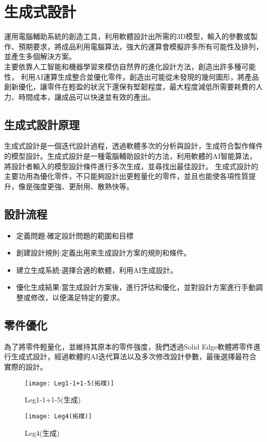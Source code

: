 \chapter{生成式設計}
運用電腦輔助系統的創造工具，利用軟體設計出所需的3D模型，輸入的參數或製作、預期要求，將成品利用電腦算法，強大的運算會模擬許多所有可能性及排列，並產生多個解決方案。\\
主要依靠人工智能和機器學習來模仿自然界的進化設計方法，創造出許多種可能性，
利用AI運算生成整合並優化零件，創造出可能從未發現的幾何圖形，將產品創新優化，讓零件在輕盈的狀況下還保有堅韌程度，最大程度減低所需要耗費的人力、時間成本，讓成品可以快速並有效的產出。\\

\section{生成式設計原理}
生成式設計是一個迭代設計過程，透過軟體多次的分析與設計，生成符合製作條件的模型設計。生成式設計是一種電腦輔助設計的方法，利用軟體的AI智能算法，將設計者輸入的模型設計條件進行多次生成，並尋找出最佳設計。
生成式設計的主要功用為優化零件，不只能夠設計出更輕量化的零件，並且也能使各項性質提升，像是強度更強、更耐用、散熱快等。\

\section{設計流程}
\begin{itemize}
\item 定義問題:確定設計問題的範圍和目標
\item 創建設計規則:定義出用來生成設計方案的規則和條件。
\item	建立生成系統:選擇合適的軟體，利用AI生成設計。
\item 優化生成結果:當生成設計方案後，進行評估和優化，並對設計方案進行手動調整或修改，以便滿足特定的要求。
\end{itemize}

\section{零件優化}
為了將零件輕量化，並維持其原本的零件強度，我們透過Solid Edge軟體將零件進行生成式設計，經過軟體的AI迭代算法以及多次修改設計參數，最後選擇最符合實際的設計。\

\begin{figure}[htbp]
  \centering
  \begin{minipage}{0.45\textwidth}
    \centering
    \texttt{[image: Leg1-1+1-5(拓樸)]}
    \caption{Leg1-1+1-5(生成)}
    \label{Leg1-1+1-5(拓樸)}
  \end{minipage}
  \hfill
  \begin{minipage}{0.45\textwidth}
    \centering
    \texttt{[image: Leg4(拓樸)]}
    \caption{Leg4(生成)}
    \label{Leg4(拓樸)}
  \end{minipage}
  \end{figure}

